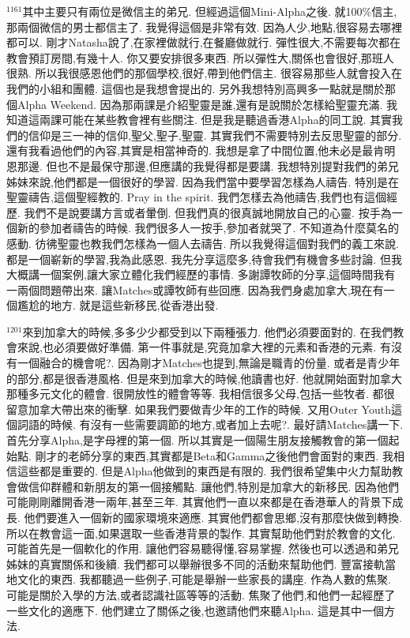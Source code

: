 \documentclass{book}
\begin{document}
$^{1161}$其中主要只有兩位是微信主的弟兄.
但經過這個Mini-Alpha之後.
就100\%信主,那兩個微信的男士都信主了.
我覺得這個是非常有效.
因為人少,地點,很容易去哪裡都可以.
剛才Natasha說了,在家裡做就行,在餐廳做就行.
彈性很大,不需要每次都在教會預訂房間,有幾十人.
你又要安排很多東西.
所以彈性大,關係也會很好,那班人很熟.
所以我很感恩他們的那個學校,很好,帶到他們信主.
很容易那些人就會投入在我們的小組和團體.
這個也是我想會提出的.
另外我想特別高興多一點就是關於那個Alpha Weekend.
因為那兩課是介紹聖靈是誰,還有是說關於怎樣給聖靈充滿.
我知道這兩課可能在某些教會裡有些關注.
但是我是聽過香港Alpha的同工說.
其實我們的信仰是三一神的信仰,聖父,聖子,聖靈.
其實我們不需要特別去反思聖靈的部分.
還有我看過他們的內容,其實是相當神奇的.
我想是拿了中間位置,他未必是最肯明恩那邊.
但也不是最保守那邊,但應講的我覺得都是要講.
我想特別提對我們的弟兄姊妹來說,他們都是一個很好的學習.
因為我們當中要學習怎樣為人禱告.
特別是在聖靈禱告,這個聖經教的.
Pray in the spirit.
我們怎樣去為他禱告,我們也有這個經歷.
我們不是說要講方言或者暈倒.
但我們真的很真誠地開放自己的心靈.
按手為一個新的參加者禱告的時候.
我們很多人一按手,參加者就哭了.
不知道為什麼莫名的感動.
彷彿聖靈也教我們怎樣為一個人去禱告.
所以我覺得這個對我們的義工來說.
都是一個嶄新的學習,我為此感恩.
我先分享這麼多,待會我們有機會多些討論.
但我大概講一個案例,讓大家立體化我們經歷的事情.
多謝譚牧師的分享,這個時間我有一兩個問題帶出來.
讓Matches或譚牧師有些回應.
因為我們身處加拿大,現在有一個尷尬的地方.
就是這些新移民,從香港出發.

$^{1201}$來到加拿大的時候,多多少少都受到以下兩種張力.
他們必須要面對的.
在我們教會來說,也必須要做好準備.
第一件事就是,究竟加拿大裡的元素和香港的元素.
有沒有一個融合的機會呢?.
因為剛才Matches也提到,無論是職青的份量.
或者是青少年的部分,都是很香港風格.
但是來到加拿大的時候,他讀書也好.
他就開始面對加拿大那種多元文化的體會.
很開放性的體會等等.
我相信很多父母,包括一些牧者.
都很留意加拿大帶出來的衝擊.
如果我們要做青少年的工作的時候.
又用Outer Youth這個詞語的時候.
有沒有一些需要調節的地方,或者加上去呢?.
最好請Matches講一下.
首先分享Alpha,是字母裡的第一個.
所以其實是一個陽生朋友接觸教會的第一個起始點.
剛才的老師分享的東西,其實都是Beta和Gamma之後他們會面對的東西.
我相信這些都是重要的.
但是Alpha他做到的東西是有限的.
我們很希望集中火力幫助教會做信仰群體和新朋友的第一個接觸點.
讓他們,特別是加拿大的新移民.
因為他們可能剛剛離開香港一兩年,甚至三年.
其實他們一直以來都是在香港華人的背景下成長.
他們要進入一個新的國家環境來適應.
其實他們都會思鄉,沒有那麼快做到轉換.
所以在教會這一面,如果選取一些香港背景的製作.
其實幫助他們對於教會的文化.
可能首先是一個軟化的作用.
讓他們容易聽得懂,容易掌握.
然後也可以透過和弟兄姊妹的真實關係和後續.
我們都可以舉辦很多不同的活動來幫助他們.
豐富接軌當地文化的東西.
我都聽過一些例子,可能是舉辦一些家長的講座.
作為人數的焦聚.
可能是關於入學的方法,或者認識社區等等的活動.
焦聚了他們,和他們一起經歷了一些文化的適應下.
他們建立了關係之後,也邀請他們來聽Alpha.
這是其中一個方法.
\end{document}
